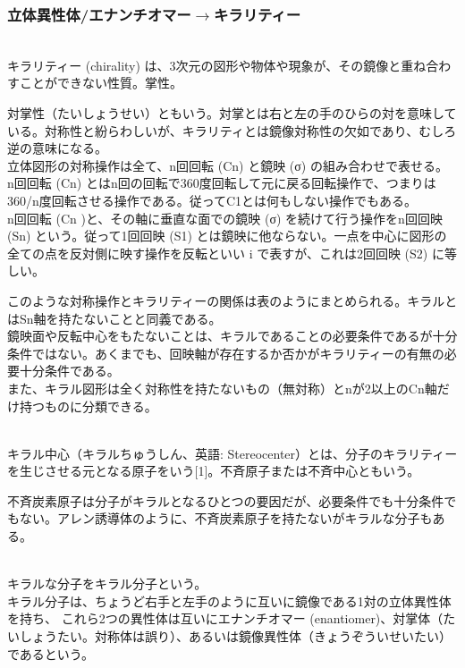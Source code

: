 \documentclass[dvipdfmx,uplatex]{jsarticle}
\begin{document}
\subsubsection{立体異性体/エナンチオマー$\rightarrow$キラリティー}
\begin{defi} \mbox{} \\
キラリティー (chirality) は、3次元の図形や物体や現象が、その鏡像と重ね合わすことができない性質。掌性。 \\
\end{defi}
対掌性（たいしょうせい）ともいう。対掌とは右と左の手のひらの対を意味している。対称性と紛らわしいが、キラリティとは鏡像対称性の欠如であり、むしろ逆の意味になる。 \\
立体図形の対称操作は全て、n回回転 (Cn) と鏡映 (σ) の組み合わせで表せる。 \\
n回回転 (Cn) とはn回の回転で360度回転して元に戻る回転操作で、つまりは360/n度回転させる操作である。従ってC1とは何もしない操作でもある。 \\
n回回転 (Cn )と、その軸に垂直な面での鏡映 (σ) を続けて行う操作をn回回映 (Sn) という。従って1回回映 (S1) とは鏡映に他ならない。一点を中心に図形の全ての点を反対側に映す操作を反転といい i で表すが、これは2回回映 (S2) に等しい。

このような対称操作とキラリティーの関係は表のようにまとめられる。キラルとはSn軸を持たないことと同義である。 \\
鏡映面や反転中心をもたないことは、キラルであることの必要条件であるが十分条件ではない。あくまでも、回映軸が存在するか否かがキラリティーの有無の必要十分条件である。 \\
また、キラル図形は全く対称性を持たないもの（無対称）とnが2以上のCn軸だけ持つものに分類できる。 \\

\begin{defi} \mbox{} \\
キラル中心（キラルちゅうしん、英語: Stereocenter）とは、分子のキラリティーを生じさせる元となる原子をいう[1]。不斉原子または不斉中心ともいう。
\end{defi}
不斉炭素原子は分子がキラルとなるひとつの要因だが、必要条件でも十分条件でもない。アレン誘導体のように、不斉炭素原子を持たないがキラルな分子もある。 \\

\begin{defi} \mbox{} \\
キラルな分子をキラル分子という。 \\
キラル分子は、ちょうど右手と左手のように互いに鏡像である1対の立体異性体を持ち、
これら2つの異性体は互いにエナンチオマー (enantiomer)、対掌体（たいしょうたい。対称体は誤り）、あるいは鏡像異性体（きょうぞういせいたい）であるという。 \\
\end{defi}
\end{document}
